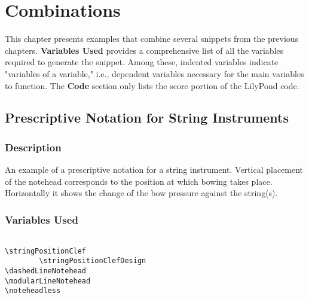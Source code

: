 
\chapter {Combinations}

This chapter presents examples that combine several snippets from the previous chapters. \textbf{Variables Used} provides a comprehensive list of all the variables required to generate the snippet. Among these, indented variables indicate "variables of a variable," i.e., dependent variables necessary for the main variables to function. The \textbf{Code} section only lists the score portion of the LilyPond code.

\section {Prescriptive Notation for String Instruments}
\label{sec:comb_strings}
\hfill
{}
\hfill

\subsection{Description}
An example of a prescriptive notation for a string instrument. Vertical placement of the notehead corresponds to the position at which bowing takes place. Horizontally it shows the change of the bow pressure against the string(s).
\subsection{Variables Used}
\begin{verbatim}

\stringPositionClef
		\stringPositionClefDesign
\dashedLineNotehead
\modularLineNotehead
\noteheadless
\end{verbatim}
